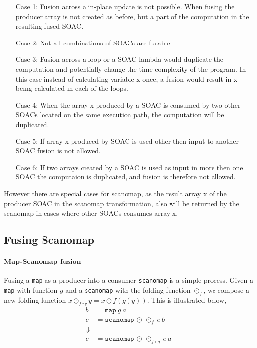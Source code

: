 \documentclass[11pt]{article}
\begin{document}
\begin{itemize}
\item[Case 1:] Fusion across a in-place update is not possible. When fusing the producer array is not created as before, but a part of the computation in the resulting fused SOAC.
\item[Case 2:] Not all combinations of SOACs are fusable.
\item[Case 3:] Fusion across a loop or a SOAC lambda would duplicate the computation and potentially change the time complexity of the program. In this case instead of calculating variable x once, a fusion would result in x being calculated in each of the loops. 
\item[Case 4:] When the array x produced by a SOAC is consumed by two other SOACs located on the same execution path, the computation will be duplicated.
\item[Case 5:] If array x produced by SOAC is used other then input to another SOAC fusion is not allowed.
\item[Case 6:] If two arrays created by a SOAC is used as input in more then one SOAC the computaion is duplicated, and fusion is therefore not allowed.
\end{itemize}

However there are special cases for scanomap, as the result array x of the producer SOAC in the scanomap transformation, also will be returned by the scanomap in cases where other SOACs consumes array x.


\subsection{Fusing Scanomap}

\paragraph{Map-Scanomap fusion}
Fusing a \texttt{map} as a producer into a consumer \texttt{scanomap} is a simple process. Given a \texttt{map} with function $g$ and a 
 \texttt{scanomap} with the folding function $\odot_f$, we compose a new folding function $x \odot_{f \circ g} y = x \odot f (g (y))$. This is illustrated below,
\begin{align*}
  b &= \mathtt{map} \: g \: a \\
  c &= \mathtt{scanomap} \: \odot \: \odot_f \: e \: b \\
\Downarrow \\
  c &= \mathtt{scanomap} \: \odot \: \odot_{f\circ g} \: e \: a
\end{align*}
\end{document}

